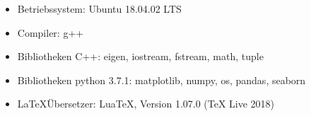 \begin{itemize}
  \item Betriebssystem: Ubuntu 18.04.02 LTS
  \item Compiler: g++
  \item Bibliotheken C++: eigen, iostream, fstream, math, tuple
  \item Bibliotheken python 3.7.1: matplotlib, numpy, os, pandas, seaborn
  \item \LaTeX Übersetzer: LuaTeX, Version 1.07.0 (TeX Live 2018)
\end{itemize}
